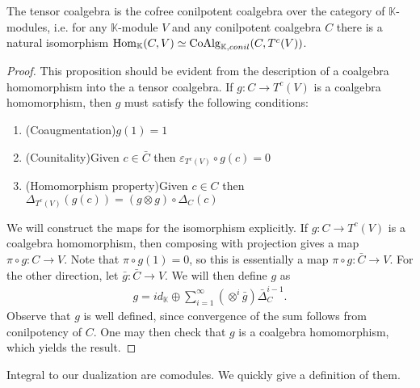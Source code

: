 \documentclass[../thesis.tex]{subfiles}
\begin{document}
            \begin{proposition}\label{prop: cofree-tensor}
                The tensor coalgebra is the cofree conilpotent coalgebra over the category of $\mathbb{K}$-modules, i.e. for any $\mathbb{K}$-module $V$ and any conilpotent coalgebra $C$ there is a natural isomorphism $\tt{Hom}_{\mathbb{K}}(C, V)\simeq \tt{CoAlg}_{\mathbb{K}, conil}(C, T^c(V))$.
            \end{proposition}

            \begin{proof}
                This proposition should be evident from the description of a coalgebra homomorphism into the a tensor coalgebra. If $g:C\rightarrow T^c(V)$ is a coalgebra homomorphism, then $g$ must satisfy the following conditions:
                \begin{enumerate}
                    \item (Coaugmentation)\quad $g(1)=1$
                    \item (Counitality)\quad Given $c\in \bar{C}$ then $\varepsilon_{T^c(V)}\circ g(c)=0$
                    \item (Homomorphism property)\quad Given $c\in C$ then $\Delta_{T^c(V)}(g(c))=(g\otimes g)\circ\Delta_C(c)$
                \end{enumerate}

                We will construct the maps for the isomorphism explicitly. If $g:C\rightarrow T^c(V)$ is a coalgebra homomorphism, then composing with projection gives a map $\pi\circ g:C\rightarrow V$. Note that $\pi\circ g(1)=0$, so this is essentially a map $\pi\circ g:\bar{C}\rightarrow V$. For the other direction, let $\bar{g}:\bar{C}\rightarrow V$. We will then define $g$ as
                \begin{align*}
                    g = id_{\mathbb{K}} \oplus \sum_{i=1}^{\infty}(\otimes^{i}\bar{g})\bar{\Delta}_C^{i-1}.
                \end{align*}
                Observe that $g$ is well defined, since convergence of the sum follows from conilpotency of $C$. One may then check that $g$ is a coalgebra homomorphism, which yields the result.
            \end{proof}

            Integral to our dualization are comodules. We quickly give a definition of them.
\end{document}
